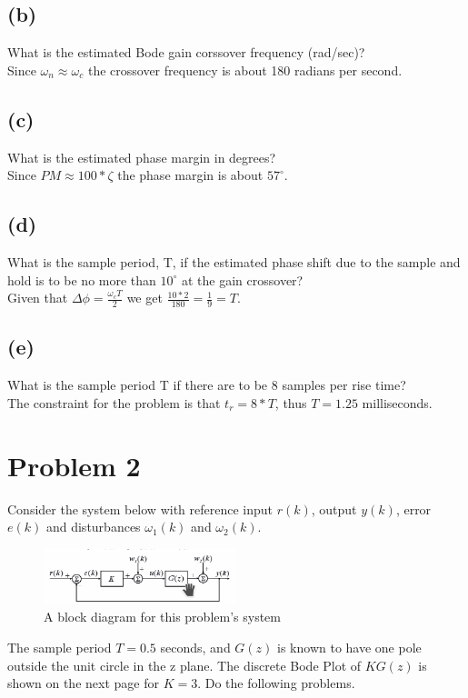 \documentclass{article}
\begin{document}
\subsection*{(b)}
What is the estimated Bode gain corssover frequency (rad/sec)?\\

Since $\omega_n\approx\omega_c$ the crossover frequency is about 180 radians per second.

\subsection*{(c)}
What is the estimated phase margin in degrees?\\

Since $PM\approx 100*\zeta$ the phase margin is about $57^\circ$.

\subsection*{(d)}
What is the sample period, T, if the estimated phase shift due to the sample and hold is to be no more than $10^\circ$ at the gain crossover?\\

Given that $\Delta\phi=\frac{\omega_c T}{2}$ we get $\frac{10*2}{180}=\frac{1}{9}=T$.

\subsection*{(e)}
What is the sample period T if there are to be 8 samples per rise time?\\

The constraint for the problem is that $t_r=8*T$, thus $T=1.25$ milliseconds.

\section*{Problem 2}
Consider the system below with reference input $r(k)$, output $y(k)$, error $e(k)$ and disturbances $\omega_1(k)$ and $\omega_2(k)$.\\
\begin{figure}[H]
    \centering
    \includegraphics[width=0.5\textwidth]{PR_2_diagram.png}
    \caption{A block diagram for this problem's system}
\end{figure}
The sample period $T=0.5$ seconds, and $G(z)$ is known to have one pole outside the unit circle in the z plane. The discrete Bode Plot of $KG(z)$ is shown on the next page for $K=3$. Do the following problems.
\end{document}
